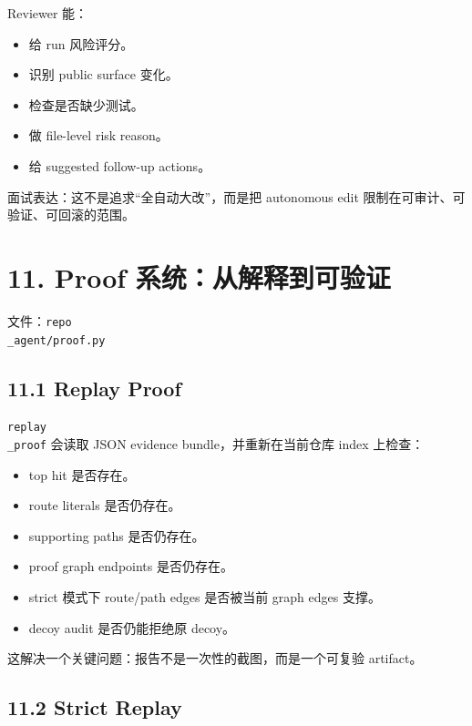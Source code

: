 \documentclass[UTF8,12pt,openany]{ctexbook}
\begin{document}
Reviewer 能：\par

\begin{itemize}
\item 给 run 风险评分。
\item 识别 public surface 变化。
\item 检查是否缺少测试。
\item 做 file-level risk reason。
\item 给 suggested follow-up actions。
\end{itemize}

面试表达：这不是追求“全自动大改”，而是把 autonomous edit 限制在可审计、可验证、可回滚的范围。\par

\section{11. Proof 系统：从解释到可验证}

文件：\texttt{repo\\_agent/proof.py}\par

\subsection{11.1 Replay Proof}

\texttt{replay\\_proof} 会读取 JSON evidence bundle，并重新在当前仓库 index 上检查：\par

\begin{itemize}
\item top hit 是否存在。
\item route literals 是否仍存在。
\item supporting paths 是否仍存在。
\item proof graph endpoints 是否仍存在。
\item strict 模式下 route/path edges 是否被当前 graph edges 支撑。
\item decoy audit 是否仍能拒绝原 decoy。
\end{itemize}

这解决一个关键问题：报告不是一次性的截图，而是一个可复验 artifact。\par

\subsection{11.2 Strict Replay}
\end{document}
